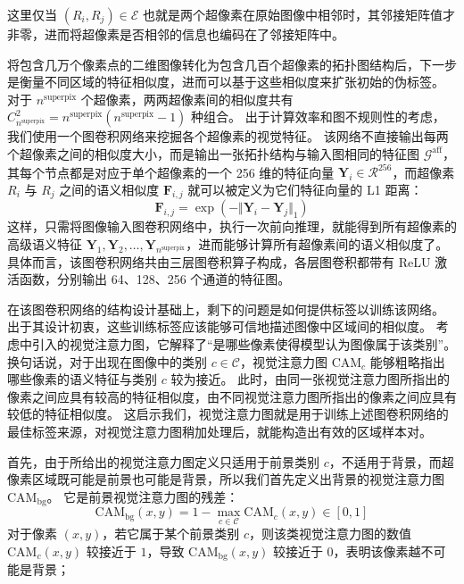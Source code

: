 这里仅当 $(R_i, R_j) \in \mathcal{E}$ 也就是两个超像素在原始图像中相邻时，其邻接矩阵值才非零，进而将超像素是否相邻的信息也编码在了邻接矩阵中。
\par
将包含几万个像素点的二维图像转化为包含几百个超像素的拓扑图结构后，下一步是衡量不同区域的特征相似度，进而可以基于这些相似度来扩张初始的伪标签。
对于 $n^\text{superpix}$ 个超像素，两两超像素间的相似度共有 $C_{n^\text{superpix}}^2 = n^\text{superpix}(n^\text{superpix}-1)$ 种组合。
出于计算效率和图不规则性的考虑，我们使用一个图卷积网络来挖掘各个超像素的视觉特征。
该网络不直接输出每两个超像素之间的相似度大小，而是输出一张拓扑结构与输入图相同的特征图 $\mathcal{G}^\text{aff}$，其每个节点都是对应于单个超像素的一个 256 维的特征向量 $\mathbf{Y}_i \in \mathcal{R}^{256}$，而超像素 $R_i$ 与 $R_j$ 之间的语义相似度 $\mathbf{F}_{i,j}$ 就可以被定义为它们特征向量的 L1 距离：
\begin{equation}
\mathbf{F}_{i,j} = \exp\left(- \Vert \mathbf{Y}_i - \mathbf{Y}_j \Vert_1\right)
\label{eqn:gcn-sim}
\end{equation}
这样，只需将图像输入图卷积网络中，执行一次前向推理，就能得到所有超像素的高级语义特征 $\mathbf{Y}_1, \mathbf{Y}_2, \dots, \mathbf{Y}_{n^\text{superpix}}$，进而能够计算所有超像素间的语义相似度了。
具体而言，该图卷积网络共由三层图卷积算子构成，各层图卷积都带有 ReLU 激活函数，分别输出 64、128、256 个通道的特征图。
\par
在该图卷积网络的结构设计基础上，剩下的问题是如何提供标签以训练该网络。
出于其设计初衷，这些训练标签应该能够可信地描述图像中区域间的相似度。
考虑中引入的视觉注意力图，它解释了“是哪些像素使得模型认为图像属于该类别”。
换句话说，对于出现在图像中的类别 $c \in \mathcal{C}$，视觉注意力图 $\text{CAM}_c$ 能够粗略指出哪些像素的语义特征与类别 $c$ 较为接近。
此时，由同一张视觉注意力图所指出的像素之间应具有较高的特征相似度，由不同视觉注意力图所指出的像素之间应具有较低的特征相似度。
这启示我们，视觉注意力图就是用于训练上述图卷积网络的最佳标签来源，对视觉注意力图稍加处理后，就能构造出有效的区域样本对。
\par
首先，由于所给出的视觉注意力图定义只适用于前景类别 $c$，不适用于背景，而超像素区域既可能是前景也可能是背景，所以我们首先定义出背景的视觉注意力图 $\text{CAM}_\text{bg}$。
它是前景视觉注意力图的残差：
\begin{equation}
\text{CAM}_\text{bg}(x,y) = 1 - \max_{c \in \mathcal{C}} \text{CAM}_c(x,y) \in [0,1]
\end{equation}
对于像素 $(x,y)$，若它属于某个前景类别 $c$，则该类视觉注意力图的数值 $\text{CAM}_c(x,y)$ 较接近于 $1$，导致 $\text{CAM}_\text{bg}(x,y)$ 较接近于 $0$，表明该像素越不可能是背景；
